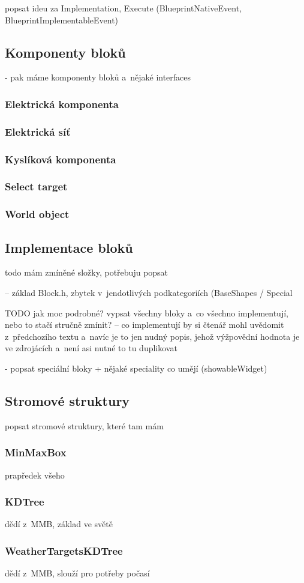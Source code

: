 popsat ideu za Implementation, Execute (BlueprintNativeEvent, BlueprintImplementableEvent)

\subsection{Komponenty bloků}
- pak máme komponenty bloků a~nějaké interfaces

\subsubsection{Elektrická komponenta}


\subsubsection{Elektrická síť}


\subsubsection{Kyslíková komponenta}


\subsubsection{Select target}


\subsubsection{World object}






\subsection{Implementace bloků}
\label{subsec:blImp}
 todo mám zmíněné složky, potřebuju popsat

 -- základ Block.h, zbytek v~jendotlivých podkategoriích (BaseShapes / Special
 
 TODO jak moc podrobné? vypsat všechny bloky a~co všechno implementují, nebo to stačí stručně zmínit? -- co implementují by si čtenář mohl uvědomit z~předchozího textu a~navíc je to jen nudný popis, jehož výžpovědní hodnota je ve zdrojácích a~není asi nutné to tu duplikovat

- popsat speciální bloky + nějaké speciality co umějí (showableWidget)


\subsection{Stromové struktury}
popsat stromové struktury, které tam mám


\subsubsection{MinMaxBox}

prapředek všeho



\subsubsection{KDTree}

dědí z~MMB, základ ve světě


\subsubsection{WeatherTargetsKDTree}

dědí z~MMB, slouží pro potřeby počasí